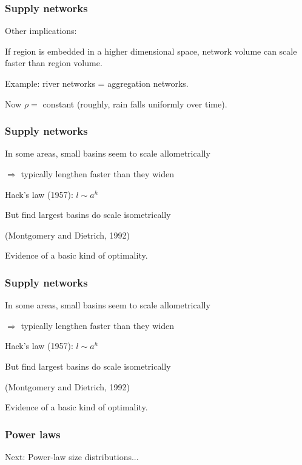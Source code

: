 \begin{frame}
  \frametitle{Supply networks}

Other implications:

If region is embedded in a higher dimensional space,
network volume can scale faster than region volume.


Example: river networks = aggregation networks.

Now $\rho =$ constant (roughly, rain falls uniformly over time).




\end{frame}

\begin{frame}
  \frametitle{Supply networks}

In some areas, small basins seem to scale allometrically

$\Rightarrow$ typically lengthen faster than
they widen

Hack's law (1957): $l \sim a^h$

\inv

But find largest basins do scale isometrically

{\small (Montgomery and Dietrich, 1992)}

Evidence of a basic kind of optimality.

\end{frame}

\begin{frame}
  \frametitle{Supply networks}

In some areas, small basins seem to scale allometrically

$\Rightarrow$ typically lengthen faster than
they widen

Hack's law (1957): $l \sim a^h$

But find largest basins do scale isometrically

{\small (Montgomery and Dietrich, 1992)}

Evidence of a basic kind of optimality.

\end{frame}

\begin{frame}
  \frametitle{Power laws}

{\Large
  Next: Power-law size distributions...
}


\end{frame}

